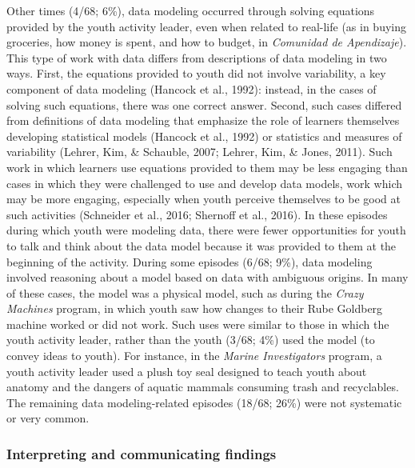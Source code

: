 \documentclass[]{msu-thesis}
\theoremstyle{definition}
\theoremstyle{definition}
\theoremstyle{definition}
\theoremstyle{remark}
\begin{document}
Other times (4/68; 6\%), data modeling occurred through solving
equations provided by the youth activity leader, even when related to
real-life (as in buying groceries, how money is spent, and how to
budget, in \emph{Comunidad de Apendizaje}). This type of work with data
differs from descriptions of data modeling in two ways. First, the
equations provided to youth did not involve variability, a key component
of data modeling (Hancock et al., 1992): instead, in the cases of
solving such equations, there was one correct answer. Second, such cases
differed from definitions of data modeling that emphasize the role of
learners themselves developing statistical models (Hancock et al., 1992)
or statistics and measures of variability (Lehrer, Kim, \& Schauble,
2007; Lehrer, Kim, \& Jones, 2011). Such work in which learners use
equations provided to them may be less engaging than cases in which they
were challenged to use and develop data models, work which may be more
engaging, especially when youth perceive themselves to be good at such
activities (Schneider et al., 2016; Shernoff et al., 2016). In these
episodes during which youth were modeling data, there were fewer
opportunities for youth to talk and think about the data model because
it was provided to them at the beginning of the activity. During some
episodes (6/68; 9\%), data modeling involved reasoning about a model
based on data with ambiguous origins. In many of these cases, the model
was a physical model, such as during the \emph{Crazy Machines} program,
in which youth saw how changes to their Rube Goldberg machine worked or
did not work. Such uses were similar to those in which the youth
activity leader, rather than the youth (3/68; 4\%) used the model (to
convey ideas to youth). For instance, in the \emph{Marine Investigators}
program, a youth activity leader used a plush toy seal designed to teach
youth about anatomy and the dangers of aquatic mammals consuming trash
and recyclables. The remaining data modeling-related episodes (18/68;
26\%) were not systematic or very common.

\subsubsection{Interpreting and communicating
findings}\label{interpreting-and-communicating-findings}
\end{document}
